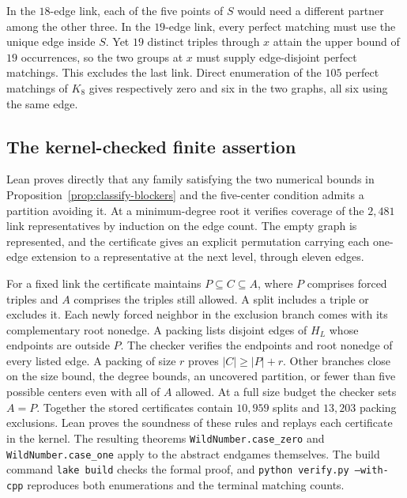 \documentclass[11pt]{article}
\begin{document}
In the $18$-edge link, each of the five points of $S$ would need a different
partner among the other three. In the $19$-edge link, every perfect matching
must use the unique edge inside $S$. Yet $19$ distinct triples through $x$
attain the upper bound of $19$ occurrences, so the two groups at $x$ must
supply edge-disjoint perfect matchings. This excludes the last link. Direct
enumeration of the $105$ perfect matchings of $K_8$ gives respectively zero
and six in the two graphs, all six using the same edge.

\subsection{The kernel-checked finite assertion}

Lean proves directly that any family satisfying the two numerical bounds
in Proposition~\ref{prop:classify-blockers} and the five-center condition
admits a partition avoiding it. At a minimum-degree root it verifies
coverage of the $2{,}481$ link representatives by induction on the edge
count. The empty graph is represented, and the certificate gives an explicit
permutation carrying each one-edge extension to a representative at the next
level, through eleven edges.

For a fixed link the certificate maintains $P\subseteq C\subseteq A$,
where $P$ comprises forced triples and $A$ comprises the triples still
allowed. A split includes a triple or excludes it. Each newly forced
neighbor in the exclusion branch comes with its complementary root nonedge.
A packing lists disjoint edges of $H_L$ whose endpoints are outside $P$.
The checker verifies the endpoints and root nonedge of every listed edge.
A packing of size $r$ proves $|C|\ge |P|+r$. Other branches close on the
size bound, the degree bounds, an uncovered partition, or fewer than five
possible centers even with all of $A$ allowed. At a full size budget the
checker sets $A=P$. Together the stored certificates contain $10{,}959$
splits and $13{,}203$ packing exclusions. Lean proves the soundness of
these rules and replays each certificate in the kernel. The resulting
theorems \texttt{WildNumber.case\_zero} and \texttt{WildNumber.case\_one}
apply to the abstract endgames themselves. The build command
\texttt{lake build} checks the formal proof, and
\texttt{python verify.py --with-cpp} reproduces both enumerations and
the terminal matching counts.
\end{document}
